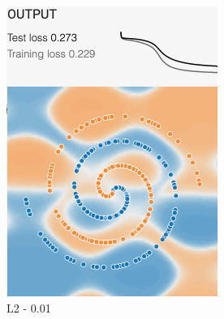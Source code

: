 \documentclass[12pt,a4paper]{article}
\begin{document}
\begin{enumerate}
\begin{figure}[H]
\begin{subfigure}[H]{0.2\textwidth}
				\includegraphics[width=\textwidth]{Figures/reg/L2001}
				\caption{L2 - 0.01}
			\end{subfigure}
			\begin{subfigure}[H]{0.2\textwidth}
				\centering

\end{subfigure}
\end{figure}
\end{enumerate}
\end{document}
